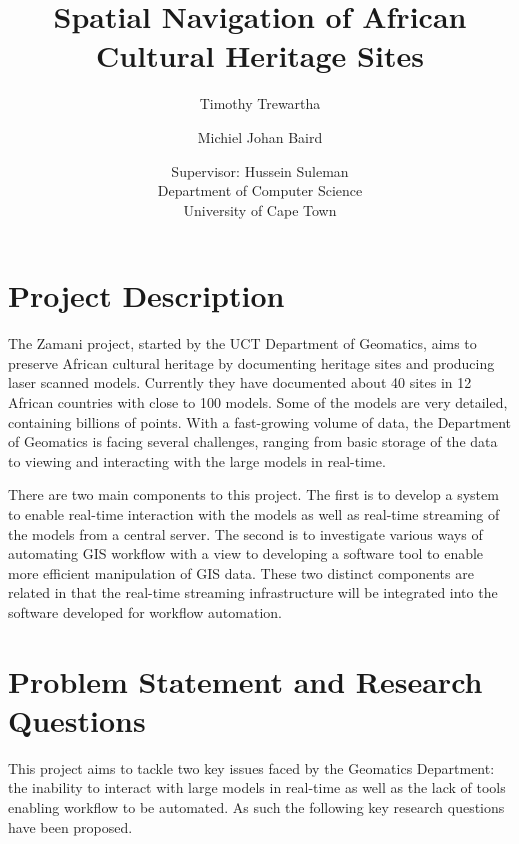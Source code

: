 \documentclass[12pt,a4paper]{article}
\begin{document}
\author{Timothy Trewartha \\
\and
Michiel Johan Baird \\
\and
Supervisor: Hussein Suleman \\
Department of Computer Science \\
University of Cape Town
 }
\title{Spatial Navigation of African Cultural Heritage Sites}
\maketitle

\section{Project Description}
The Zamani project, started by the UCT Department of Geomatics, aims to
preserve African cultural heritage by documenting heritage sites and producing
laser scanned models. Currently they have documented about 40 sites in 12 African
countries with close to 100 models. Some of the models are very detailed, containing
billions of points. With a fast-growing volume of data, the Department of Geomatics
is facing several challenges, ranging from basic storage of the data to viewing and
interacting with the large models in real-time.

There are two main components to this project. The first is to develop a system to
enable real-time interaction with the models as well as real-time streaming of the
models from a central server. The second is to investigate
various ways of automating GIS workflow with a view to developing a software tool
to enable more efficient manipulation of GIS data. These two distinct components
are related in that the real-time streaming infrastructure will be integrated into
the software developed for workflow automation.

\section{Problem Statement and Research Questions}
This project aims to tackle two key issues faced by the Geomatics Department: the inability to interact with large models in real-time as well as the lack of tools enabling workflow to be automated. As such the following key research questions have been proposed.
\end{document}
